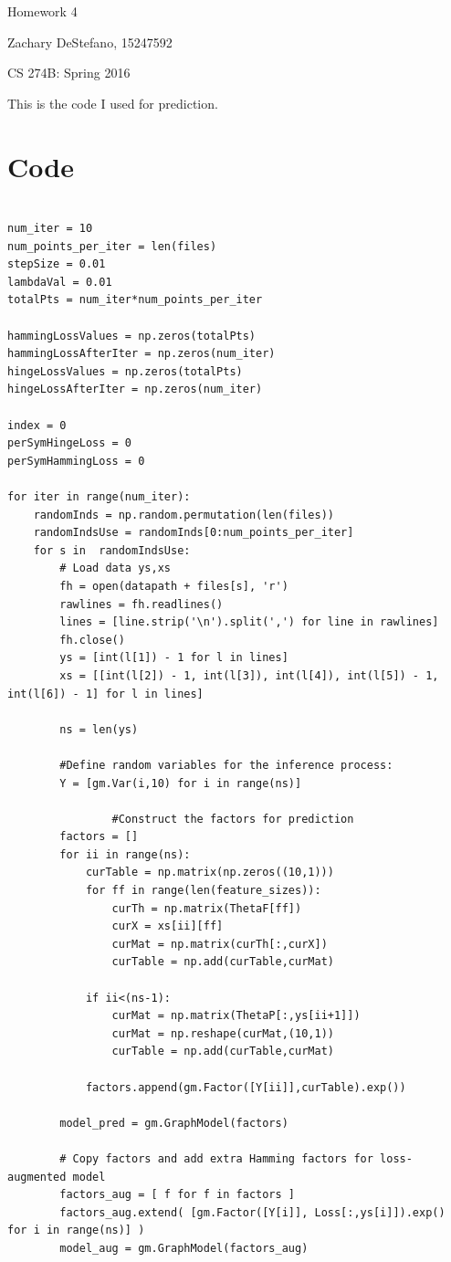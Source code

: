 \documentclass[twoside,11pt]{article}
\theoremstyle{definition}
\begin{document}
\centerline{\Large Homework 4}
\centerline{Zachary DeStefano, 15247592}
\centerline{CS 274B: Spring 2016}

This is the code I used for prediction. 

\section*{Code}


\begin{lstlisting}

num_iter = 10
num_points_per_iter = len(files)
stepSize = 0.01
lambdaVal = 0.01
totalPts = num_iter*num_points_per_iter

hammingLossValues = np.zeros(totalPts)
hammingLossAfterIter = np.zeros(num_iter)
hingeLossValues = np.zeros(totalPts)
hingeLossAfterIter = np.zeros(num_iter)

index = 0
perSymHingeLoss = 0
perSymHammingLoss = 0

for iter in range(num_iter):
    randomInds = np.random.permutation(len(files))
    randomIndsUse = randomInds[0:num_points_per_iter]
    for s in  randomIndsUse:
        # Load data ys,xs
        fh = open(datapath + files[s], 'r')
        rawlines = fh.readlines()
        lines = [line.strip('\n').split(',') for line in rawlines]
        fh.close()
        ys = [int(l[1]) - 1 for l in lines]
        xs = [[int(l[2]) - 1, int(l[3]), int(l[4]), int(l[5]) - 1, int(l[6]) - 1] for l in lines]

        ns = len(ys)

        #Define random variables for the inference process:
        Y = [gm.Var(i,10) for i in range(ns)]

				#Construct the factors for prediction
        factors = []
        for ii in range(ns):
            curTable = np.matrix(np.zeros((10,1)))
            for ff in range(len(feature_sizes)):
                curTh = np.matrix(ThetaF[ff])
                curX = xs[ii][ff]
                curMat = np.matrix(curTh[:,curX])
                curTable = np.add(curTable,curMat)

            if ii<(ns-1):
                curMat = np.matrix(ThetaP[:,ys[ii+1]])
                curMat = np.reshape(curMat,(10,1))
                curTable = np.add(curTable,curMat)
								
            factors.append(gm.Factor([Y[ii]],curTable).exp())

        model_pred = gm.GraphModel(factors)

        # Copy factors and add extra Hamming factors for loss-augmented model
        factors_aug = [ f for f in factors ]
        factors_aug.extend( [gm.Factor([Y[i]], Loss[:,ys[i]]).exp() for i in range(ns)] )
        model_aug = gm.GraphModel(factors_aug)


\end{lstlisting}
\end{document}

